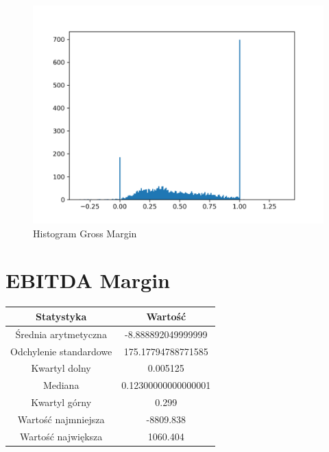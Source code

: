 \documentclass{article}
\begin{document}
\begin{figure}[h!]
    \includegraphics[width=\linewidth]{variables/Gross Margin.png}
    \caption{Histogram Gross Margin }
\end{figure}\section{ EBITDA Margin }

\begin{center}
    \begin{tabular}{|c | c|} 
    \hline
    Statystyka & Wartość \\
    \hline\hline
    Średnia arytmetyczna & -8.888892049999999 \\ 
    \hline
    Odchylenie standardowe & 175.17794788771585 \\
    \hline
    Kwartyl dolny & 0.005125 \\
    \hline
    Mediana & 0.12300000000000001 \\
    \hline
    Kwartyl górny & 0.299 \\
    \hline
    Wartość najmniejsza & -8809.838 \\
    \hline
    Wartość największa & 1060.404 \\
    \hline
   \end{tabular}
\end{center}
\end{document}
